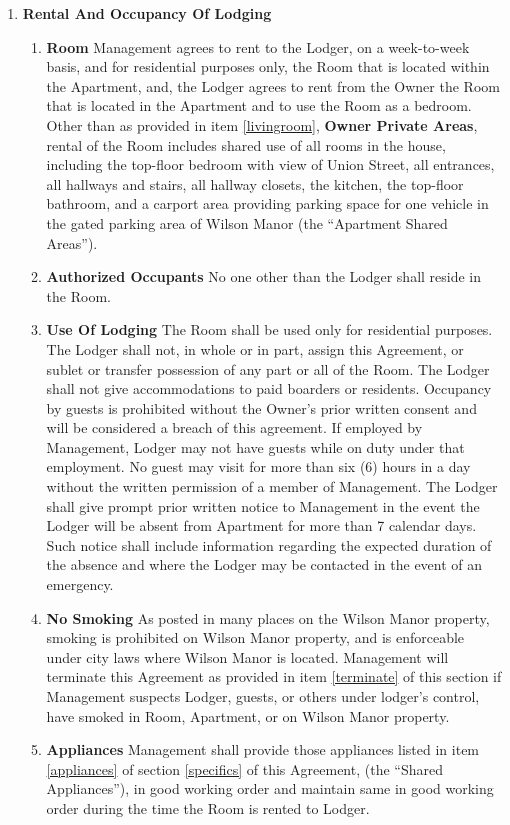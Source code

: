 \documentclass[12pt,letterpaper]{article}
\newcommand{\lodger}{Lodger}
\newcommand{\management}{Management}
\newcommand{\condo}{Wilson Manor}
\newcommand{\apt}{Apartment}
\newcommand{\room}{Room}
\newcommand{\shared}{Apartment Shared Areas}
\newcommand{\livingroom}{Owner Private Areas}
\newcommand{\appliances}{Shared Appliances}
\begin{document}
\begin{enumerate}
	\item \textbf{Rental And Occupancy Of Lodging} \quad 
		\begin{enumerate}
			\item \textbf{Room} \quad
				\management{} agrees to rent to the \lodger{}, on a week-to-week basis, and for residential purposes only, the \room{} that is located within the \apt{}, and, the \lodger{} agrees to rent from the Owner the \room{} that is located in the \apt{} and to use the \room{} as a bedroom.  Other than as provided in item \ref{livingroom}, \textbf{\livingroom{}}, rental of the \room{} includes shared use of all rooms in the house, including the top-floor bedroom with view of Union Street, all entrances, all hallways and stairs, all hallway closets, the kitchen, the top-floor bathroom, and a carport area providing parking space for one vehicle in the gated parking area of \condo{} (the ``\shared{}'').
			\item \textbf{Authorized Occupants} \quad No one other than the \lodger{} shall reside in the \room{}. 
			\item \textbf{Use Of Lodging} \quad The \room{} shall be used only for residential purposes. The \lodger{} shall not, in whole or in part, assign this Agreement, or sublet or transfer possession of any part or all of the \room{}. The \lodger{} shall not give accommodations to paid boarders or residents. Occupancy by guests is prohibited without the Owner's prior written consent and will be considered a breach of this agreement. If employed by \management{}, \lodger{} may not have guests while on duty under that employment. No guest may visit for more than six (6) hours in a day without the written permission of a member of \management{}. The \lodger{} shall give prompt prior written notice to \management{} in the event the \lodger{} will be absent from \apt{} for more than 7 calendar days. Such notice shall include information regarding the expected duration of the absence and where the \lodger{} may be contacted in the event of an emergency. 
			\item \textbf{No Smoking} \quad As posted in many places on the \condo{} property, smoking is prohibited on \condo{} property, and is enforceable under city laws where \condo{} is located. \management{} will terminate this Agreement as provided in item \ref{terminate} of this section if \management{} suspects \lodger{}, guests, or others under lodger's control, have smoked in \room{}, \apt{}, or on \condo{} property.
			\item \textbf{Appliances} \quad \management{} shall provide those appliances listed in item \ref{appliances} of section \ref{specifics} of this Agreement{}, (the ``\appliances{}''), in good working order and maintain same in good working order during the time the \room{} is rented to \lodger{}.

\end{enumerate}
\end{enumerate}
\end{document}
